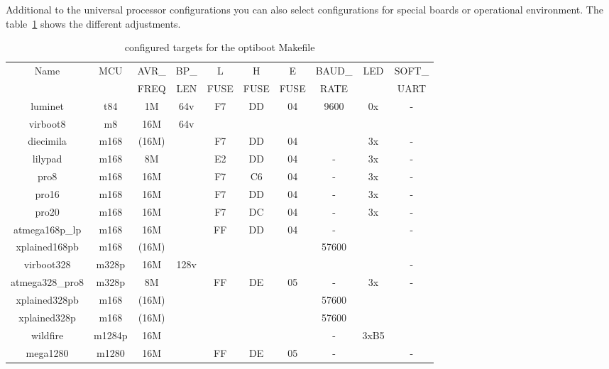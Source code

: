 Additional to the universal processor configurations you can also select
configurations for special boards or operational environment.
The table~\ref{tab:boards} shows the different adjustments.

\begin{table}[H]
  \begin{center}
    \begin{tabular}{| c | c | c | c | c | c | c | c | c | c | }
    \hline
             Name  & MCU & AVR\_ & BP\_ & L     & H     & E     & BAUD\_ & LED & SOFT\_ \\
                   &     & FREQ  & LEN  &  FUSE & FUSE  &  FUSE & RATE &     & UART \\
    \hline
    \hline
       luminet     & t84 &  1M   & 64v &  F7   &  DD   &  04   & 9600 & 0x  &  -   \\

    \hline
         virboot8  & m8    & 16M & 64v &       &       &       &      &     &      \\
    \hline
       diecimila  &  m168 & (16M) &     &  F7   &  DD   &  04   &      & 3x  &  -   \\
       lilypad    &  m168  & 8M  &      &  E2   &  DD   &  04   &  -   & 3x  &  -   \\
       pro8       &  m168  & 16M &      &  F7   &  C6   &  04   &  -   & 3x  &  -   \\
       pro16      &  m168  & 16M &      &  F7   &  DD   &  04   &  -   & 3x  &  -   \\
       pro20      &  m168  & 16M &      &  F7   &  DC   &  04   &  -   & 3x  &  -   \\
    atmega168p\_lp&  m168  & 16M &      &  FF   &  DD   &  04   &  -   &     &  -   \\
   xplained168pb  &  m168  &(16M)&      &       &       &      & 57600 &     &      \\
    \hline
       virboot328  & m328p & 16M & 128v &       &       &       &      &     &  -   \\
    atmega328\_pro8& m328p & 8M  &      &  FF   &  DE   &  05   &  -   & 3x  &  -   \\
   xplained328pb  &  m168  &(16M)&      &       &       &      & 57600 &     &      \\
   xplained328p   &  m168  &(16M)&      &       &       &      & 57600 &     &      \\
    \hline
        wildfire  & m1284p & 16M &      &       &       &      &   -   & 3xB5 &      \\
    \hline
       mega1280    & m1280 & 16M &      &  FF   &  DE   &  05   &  -   &     &  -   \\
    \hline
    \end{tabular}
  \end{center}
  \caption{configured targets for the optiboot Makefile}
  \label{tab:boards}
\end{table}

